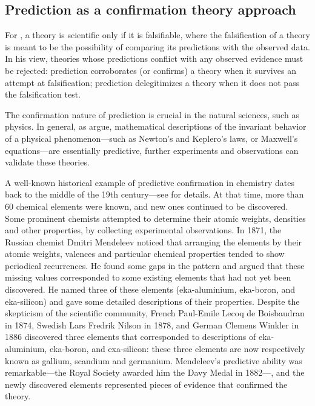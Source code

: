 \documentclass{statsoc}
\begin{document}

\subsection{Prediction as a confirmation theory approach}


For \cite{popper1934logic}, a theory is scientific only if it is falsifiable, where the falsification of a theory is meant to be the possibility of comparing its predictions 
with the observed data. In his view, theories whose predictions conflict with any observed evidence must be rejected: prediction corroborates (or confirms) a theory when it survives 
an attempt at falsification; prediction delegitimizes a theory when it does not pass the falsification test.

The confirmation nature of prediction is crucial in the natural sciences, such as physics. In general,  as \cite{hitchcock2004prediction} argue,   mathematical descriptions of the 
invariant behavior of a physical phenomenon---such as Newton's and Keplero's laws, or Maxwell's equations---are essentially predictive, further experiments and observations can validate these theories. 

A well-known historical example of predictive confirmation in chemistry dates back to the middle of the 19th century---see \cite{maher1988prediction} for  details. At that time, more than 60 chemical elements were known, and new ones continued to be discovered. Some prominent chemists attempted to determine their atomic weights, 
densities and other properties, by collecting experimental observations. In 1871, the Russian chemist Dmitri Mendeleev noticed that arranging the elements by their atomic 
weights, valences and particular chemical properties tended to show periodical recurrences. He found some gaps in the pattern and argued that these missing values corresponded to 
some existing elements that had not yet been discovered. He named three of these elements (eka-aluminium, eka-boron, and eka-silicon) and gave some detailed descriptions of their 
properties. Despite the skepticism of the scientific community,  French Paul-Emile Lecoq de Boisbaudran in 1874,  Swedish Lars Fredrik Nilson in 1878, and  German Clemens 
Winkler in 1886 discovered three elements that corresponded to descriptions of eka-aluminium, eka-boron, and exa-silicon: these three elements are now respectively 
known as gallium, scandium and germanium.  Mendeleev's predictive ability was remarkable---the Royal Society awarded him the Davy Medal in 1882---, and the newly discovered elements represented pieces of evidence that confirmed the theory.
\end{document}
